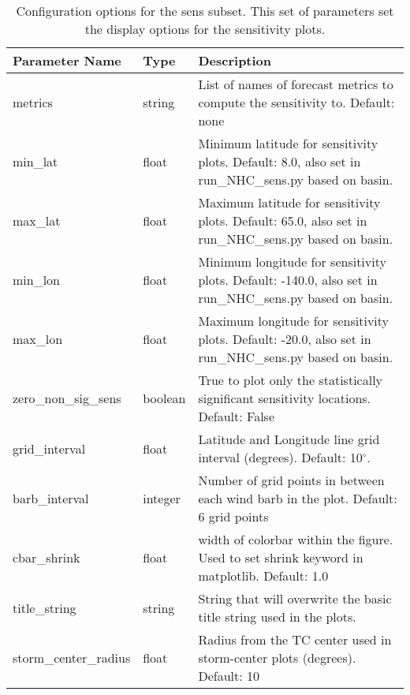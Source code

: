 \documentclass[psfig,12pt]{article}
\begin{document}
\begin{table}[H]
\caption{Configuration options for the sens subset.  This set of parameters set the display options
for the sensitivity plots.}
\begin{center}
\begin{tabular}{|p{1.60in}|p{0.5in}|p{4.15in}|}
\hline
Parameter Name & Type & Description \\  \hline \hline

metrics & string & List of names of forecast metrics to compute the sensitivity to.  Default:  none \\ \hline

min\_lat & float & Minimum latitude for sensitivity plots.  Default:  8.0, also set in
run\_NHC\_sens.py based on basin.  \\ \hline

max\_lat & float & Maximum latitude for sensitivity plots.  Default:  65.0, also set in
run\_NHC\_sens.py based on basin.  \\ \hline

min\_lon & float & Minimum longitude for sensitivity plots.  Default:  -140.0, also set in 
run\_NHC\_sens.py based on basin.  \\ \hline

max\_lon & float & Maximum longitude for sensitivity plots.  Default:  -20.0, also set in
run\_NHC\_sens.py based on basin.  \\ \hline

zero\_non\_sig\_sens & boolean & True to plot only the statistically significant 
sensitivity locations.  Default:  False   \\ \hline

grid\_interval & float & Latitude and Longitude line grid interval (degrees).  Default:  10$^{\circ}$.  \\ \hline

barb\_interval & integer & Number of grid points in between each wind barb in the plot.
Default:  6 grid points  \\ \hline

cbar\_shrink & float & width of colorbar within the figure.  Used to set shrink keyword in matplotlib.
Default: 1.0 \\ \hline

title\_string & string & String that will overwrite the basic title string used in the plots. \\ \hline

storm\_center\_radius & float & Radius from the TC center used in storm-center plots 
(degrees).  Default:  10 \\ \hline


\end{tabular}
\end{center}
\end{table}
\end{document}

